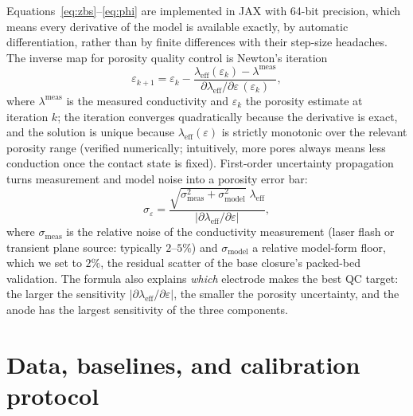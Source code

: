 \documentclass[10pt,a4paper]{article}
\newcommand{\leff}{\lambda_{\mathrm{eff}}}
\begin{document}
Equations~\eqref{eq:zbs}--\eqref{eq:phi} are implemented in JAX with 64-bit precision, which means every derivative of the model is available exactly, by automatic differentiation, rather than by finite differences with their step-size headaches. The inverse map for porosity quality control is Newton's iteration
\begin{equation}
\varepsilon_{k+1}=\varepsilon_{k}-\frac{\leff(\varepsilon_{k})-\lambda^{\mathrm{meas}}}{\partial\leff/\partial\varepsilon\,(\varepsilon_{k})},
\label{eq:newton}
\end{equation}
where $\lambda^{\mathrm{meas}}$ is the measured conductivity and $\varepsilon_k$ the porosity estimate at iteration $k$; the iteration converges quadratically because the derivative is exact, and the solution is unique because $\leff(\varepsilon)$ is strictly monotonic over the relevant porosity range (verified numerically; intuitively, more pores always means less conduction once the contact state is fixed). First-order uncertainty propagation turns measurement and model noise into a porosity error bar:
\begin{equation}
\sigma_{\varepsilon}
=\frac{\sqrt{\sigma_{\mathrm{meas}}^{2}+\sigma_{\mathrm{model}}^{2}}\;\leff}
{\bigl|\partial\leff/\partial\varepsilon\bigr|},
\label{eq:sigma}
\end{equation}
where $\sigma_{\mathrm{meas}}$ is the relative noise of the conductivity measurement (laser flash or transient plane source: typically $2$--$5\%$) and $\sigma_{\mathrm{model}}$ a relative model-form floor, which we set to $2\%$, the residual scatter of the base closure's packed-bed validation. The formula also explains \emph{which} electrode makes the best QC target: the larger the sensitivity $|\partial\leff/\partial\varepsilon|$, the smaller the porosity uncertainty, and the anode has the largest sensitivity of the three components.

\section{Data, baselines, and calibration protocol}
\label{sec:data}
\end{document}
